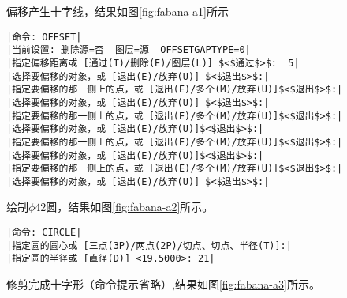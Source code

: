 \begin{procedure}
偏移产生十字线，结果如图\ref{fig:fabana-a1}所示
\begin{lstlisting}
|命令: OFFSET|
|当前设置: 删除源=否  图层=源  OFFSETGAPTYPE=0|
|指定偏移距离或 [通过(T)/删除(E)/图层(L)] $<$通过$>$:  5|
|选择要偏移的对象，或 [退出(E)/放弃(U)] $<$退出$>$:|
|指定要偏移的那一侧上的点，或 [退出(E)/多个(M)/放弃(U)]$<$退出$>$:|
|选择要偏移的对象，或 [退出(E)/放弃(U)] $<$退出$>$:|
|指定要偏移的那一侧上的点，或 [退出(E)/多个(M)/放弃(U)]$<$退出$>$:|
|选择要偏移的对象，或 [退出(E)/放弃(U)]$<$退出$>$:|
|指定要偏移的那一侧上的点，或 [退出(E)/多个(M)/放弃(U)]$<$退出$>$:|
|选择要偏移的对象，或 [退出(E)/放弃(U)]$<$退出$>$:|
|指定要偏移的那一侧上的点，或 [退出(E)/多个(M)/放弃(U)]$<$退出$>$:|
|选择要偏移的对象，或 [退出(E)/放弃(U)] $<$退出$>$:|
\end{lstlisting}
绘制$\phi 42$圆，结果如图\ref{fig:fabana-a2}所示。
\begin{lstlisting}
|命令: CIRCLE|
|指定圆的圆心或 [三点(3P)/两点(2P)/切点、切点、半径(T)]:|
|指定圆的半径或 [直径(D)] <19.5000>: 21|
\end{lstlisting}
修剪完成十字形（命令提示省略）,结果如图\ref{fig:fabana-a3}所示。
\begin{figure}[htbp]
\centering
\begin{floatrow}[3]
\end{floatrow}
\end{figure}


\end{procedure}
